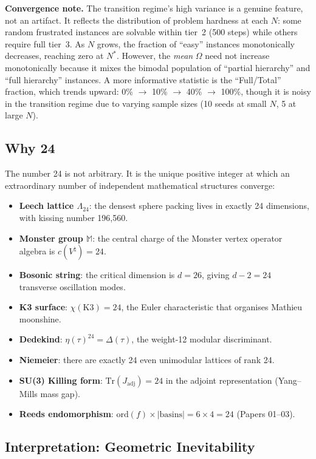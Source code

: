 \documentclass[11pt,a4paper]{article}
\begin{document}
\noindent\textbf{Convergence note.} The transition regime's high variance is a genuine feature, not an artifact. It reflects the distribution of problem hardness at each $N$: some random frustrated instances are solvable within tier~2 (500 steps) while others require full tier~3. As $N$ grows, the fraction of ``easy'' instances monotonically decreases, reaching zero at $N^*$. However, the \emph{mean} $\Omega$ need not increase monotonically because it mixes the bimodal population of ``partial hierarchy'' and ``full hierarchy'' instances. A more informative statistic is the ``Full/Total'' fraction, which trends upward: 0\% $\to$ 10\% $\to$ 40\% $\to$ 100\%, though it is noisy in the transition regime due to varying sample sizes (10 seeds at small $N$, 5 at large $N$).

\subsection{Why 24}

The number 24 is not arbitrary.
It is the unique positive integer at which an extraordinary number of independent mathematical structures converge:
\begin{itemize}[nosep]
\item \textbf{Leech lattice $\Lambda_{24}$}: the densest sphere packing lives in exactly 24 dimensions, with kissing number 196{,}560.
\item \textbf{Monster group $\mathbb{M}$}: the central charge of the Monster vertex operator algebra is $c(V^\natural) = 24$.
\item \textbf{Bosonic string}: the critical dimension is $d = 26$, giving $d - 2 = 24$ transverse oscillation modes.
\item \textbf{K3 surface}: $\chi(\mathrm{K3}) = 24$, the Euler characteristic that organises Mathieu moonshine.
\item \textbf{Dedekind}: $\eta(\tau)^{24} = \Delta(\tau)$, the weight-12 modular discriminant.
\item \textbf{Niemeier}: there are exactly 24 even unimodular lattices of rank 24.
\item \textbf{SU(3) Killing form}: $\mathrm{Tr}(J_{\mathrm{adj}}) = 24$ in the adjoint representation (Yang--Mills mass gap).
\item \textbf{Reeds endomorphism}: $\mathrm{ord}(f) \times |\mathrm{basins}| = 6 \times 4 = 24$ (Papers 01--03).
\end{itemize}

\subsection{Interpretation: Geometric Inevitability}
\end{document}
